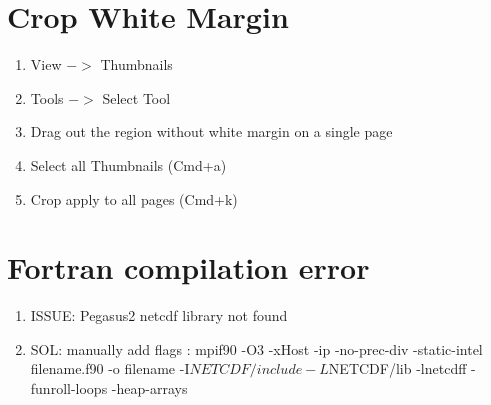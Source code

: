\documentclass[12pt]{article}
\begin{document}
\section{Crop White Margin}

\begin{enumerate}
   \item View $->$ Thumbnails
   \item Tools $->$ Select Tool
   \item Drag out the region without white margin on a single page
   \item Select all Thumbnails (Cmd+a)
   \item Crop apply to all pages (Cmd+k)
\end{enumerate}

\section{Fortran compilation error}

\begin{enumerate}
  \item ISSUE: Pegasus2 netcdf library not found 
  \item SOL: manually add flags : mpif90 -O3 -xHost -ip -no-prec-div -static-intel filename.f90 -o filename -I$NETCDF/include -L$NETCDF/lib -lnetcdff -funroll-loops -heap-arrays
\end{enumerate}
\end{document}
